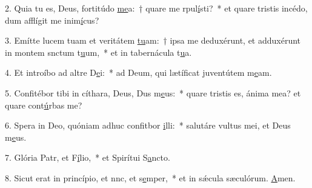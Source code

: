 2. Quia tu es, Deus, fortitúdo \uline{me}a:~† quare me rpul\uline{í}sti?~* et quare tristis incédo, dum afflígit me inim\uline{í}cus?\par 
3. Emítte lucem tuam et veritátem \uline{tu}am:~† ipsa me deduxérunt, et adduxérunt in montem snctum t\uline{u}um,~* et in tabernácula t\uline{u}a.\par 
4. Et introíbo ad altre D\uline{e}i:~* ad Deum, qui lætíficat juventútem m\uline{e}am.\par 
5. Confitébor tibi in cíthara, Deus, Dus m\uline{e}us:~* quare tristis es, ánima mea? et quare cont\uline{ú}rbas me?\par 
6. Spera in Deo, quóniam adhuc confitbor \uline{i}lli:~* salutáre vultus mei, et Deus m\uline{e}us.\par 
7. Glória Patr, et F\uline{í}lio,~* et Spirítui S\uline{a}ncto.\par 
8. Sicut erat in princípio, et nnc, et s\uline{e}mper,~* et in sǽcula sæculórum. \uline{A}men.\par 
